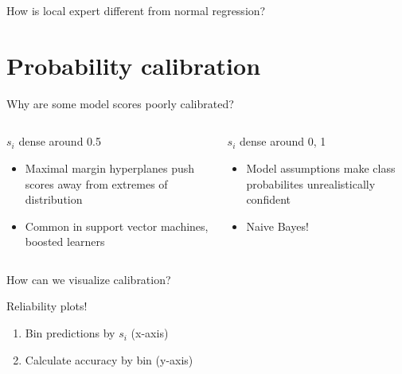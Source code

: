 \documentclass[ignorenonframetext,]{beamer}
\providecommand{\tightlist}{%
\setlength{\itemsep}{0pt}\setlength{\parskip}{0pt}}
\begin{document}
\begin{frame}{How is local expert different from normal regression?}

\end{frame}

\section{Probability calibration}\label{probability-calibration}

\begin{frame}{Why are some model scores poorly calibrated?}

\begin{columns}[t]
\begin{column}{0.48\textwidth}

\begin{block}{$s_i$ dense around 0.5}
\begin{itemize}
\item Maximal margin hyperplanes push scores away from extremes of distribution
\item Common in support vector machines, boosted learners
\end{itemize}
\end{block}

\end{column}


\begin{column}{0.48\textwidth}

\begin{block}{$s_i$ dense around 0, 1}
\begin{itemize}
\item Model assumptions make class probabilites unrealistically confident
\item Naive Bayes!
\end{itemize}
\end{block}
\end{column}
\end{columns}

\end{frame}

\begin{frame}{How can we visualize calibration?}

\begin{block}{Reliability plots!}

\begin{enumerate}
\def\labelenumi{\arabic{enumi}.}
\tightlist
\item
  Bin predictions by \(s_i\) (x-axis)
\item
  Calculate accuracy by bin (y-axis)
\end{enumerate}

\end{block}

\end{frame}
\end{document}
